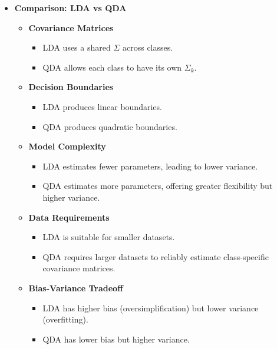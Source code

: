 \documentclass[12pt]{article}
\begin{document}
\begin{itemize}
    \item \textbf{Comparison: LDA vs QDA}
    \begin{itemize}
        \item \textbf{Covariance Matrices}
        \begin{itemize}
            \item LDA uses a shared $\Sigma$ across classes.
            \item QDA allows each class to have its own $\Sigma_k$.
        \end{itemize}
        \item \textbf{Decision Boundaries}
        \begin{itemize}
            \item LDA produces linear boundaries.
            \item QDA produces quadratic boundaries.
        \end{itemize}
        \item \textbf{Model Complexity}
        \begin{itemize}
            \item LDA estimates fewer parameters, leading to lower variance.
            \item QDA estimates more parameters, offering greater flexibility but higher variance.
        \end{itemize}
        \item \textbf{Data Requirements}
        \begin{itemize}
            \item LDA is suitable for smaller datasets.
            \item QDA requires larger datasets to reliably estimate class-specific covariance matrices.
        \end{itemize}
        \item \textbf{Bias-Variance Tradeoff}
        \begin{itemize}
            \item LDA has higher bias (oversimplification) but lower variance (overfitting).
            \item QDA has lower bias but higher variance.
        \end{itemize}
    \end{itemize}
    

\end{itemize}
\end{document}
